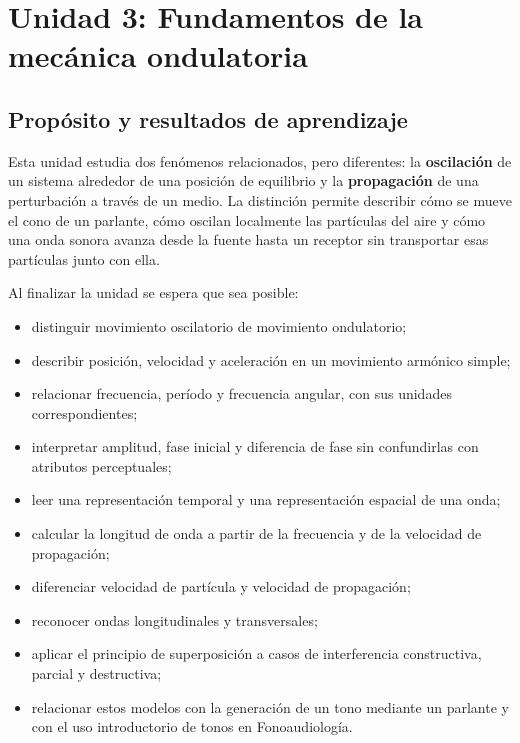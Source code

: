 \chapter{Unidad 3: Fundamentos de la mecánica ondulatoria}
\label{chap:unidad-3}

\section{Propósito y resultados de aprendizaje}
\label{sec:u3-proposito}

Esta unidad estudia dos fenómenos relacionados, pero diferentes: la
\textbf{oscilación} de un sistema alrededor de una posición de equilibrio y la
\textbf{propagación} de una perturbación a través de un medio. La distinción
permite describir cómo se mueve el cono de un parlante, cómo oscilan localmente
las partículas del aire y cómo una onda sonora avanza desde la fuente hasta un
receptor sin transportar esas partículas junto con ella.

Al finalizar la unidad se espera que sea posible:

\begin{itemize}
    \item distinguir movimiento oscilatorio de movimiento ondulatorio;
    \item describir posición, velocidad y aceleración en un movimiento
    armónico simple;
    \item relacionar frecuencia, período y frecuencia angular, con sus
    unidades correspondientes;
    \item interpretar amplitud, fase inicial y diferencia de fase sin
    confundirlas con atributos perceptuales;
    \item leer una representación temporal y una representación espacial de
    una onda;
    \item calcular la longitud de onda a partir de la frecuencia y de la
    velocidad de propagación;
    \item diferenciar velocidad de partícula y velocidad de propagación;
    \item reconocer ondas longitudinales y transversales;
    \item aplicar el principio de superposición a casos de interferencia
    constructiva, parcial y destructiva;
    \item relacionar estos modelos con la generación de un tono mediante un
    parlante y con el uso introductorio de tonos en Fonoaudiología.
\end{itemize}

